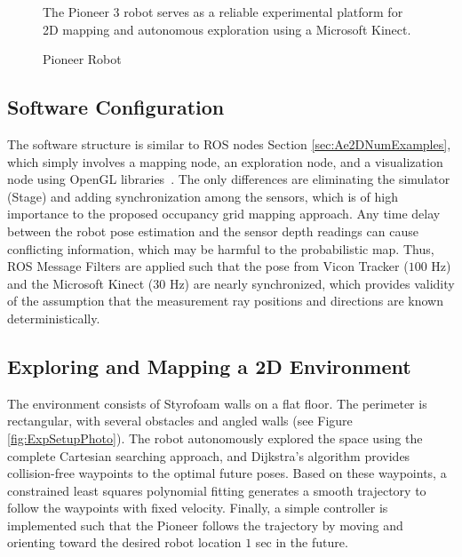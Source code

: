 \begin{figure}
\caption{Pioneer Robot}
	\medskip
	\small
	The Pioneer 3 robot serves as a reliable experimental platform for 2D mapping and autonomous exploration using a Microsoft Kinect.
\label{fig:Pioneer}
\end{figure}

\subsection{Software Configuration}

The software structure is similar to ROS nodes Section \ref{sec:Ae2DNumExamples}, which simply involves a mapping node, an exploration node, and a visualization node using OpenGL libraries~\cite{openGL}. The only differences are eliminating the simulator (Stage) and adding synchronization among the sensors, which is of high importance to the proposed occupancy grid mapping approach. Any time delay between the robot pose estimation and the sensor depth readings can cause conflicting information, which may be harmful to the probabilistic map. Thus, ROS Message Filters are applied such that the pose from Vicon Tracker ($100$ Hz) and the Microsoft Kinect ($30$ Hz) are nearly synchronized, which provides validity of the assumption that the measurement ray positions and directions are known deterministically.

\subsection{Exploring and Mapping a 2D Environment}
The environment consists of Styrofoam walls on a flat floor. The perimeter is rectangular, with several obstacles and angled walls (see Figure \ref{fig:ExpSetupPhoto}). The robot autonomously explored the space using the complete Cartesian searching approach, and Dijkstra's algorithm provides collision-free waypoints to the optimal future poses. Based on these waypoints, a constrained least squares polynomial fitting generates a smooth trajectory to follow the waypoints with fixed velocity. Finally, a simple controller is implemented such that the Pioneer follows the trajectory by moving and orienting toward the desired robot location $1$ sec in the future.

